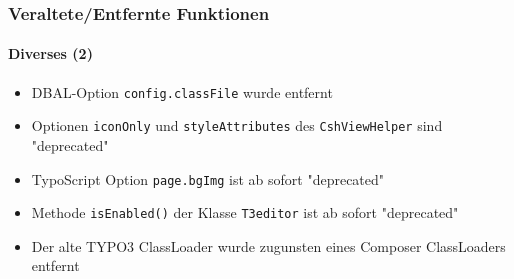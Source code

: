 \begin{frame}[fragile]
	\frametitle{Veraltete/Entfernte Funktionen}
	\framesubtitle{Diverses (2)}

	\begin{itemize}

		\item DBAL-Option \texttt{config.classFile} wurde entfernt

		\item Optionen \texttt{iconOnly} und \texttt{styleAttributes} des
			\texttt{CshViewHelper} sind "deprecated"

		\item TypoScript Option \texttt{page.bgImg} ist ab sofort "deprecated"

		\item Methode \texttt{isEnabled()} der Klasse \texttt{T3editor} ist ab sofort "deprecated"

		\item Der alte TYPO3 ClassLoader wurde zugunsten eines Composer ClassLoaders entfernt

	\end{itemize}

\end{frame}

